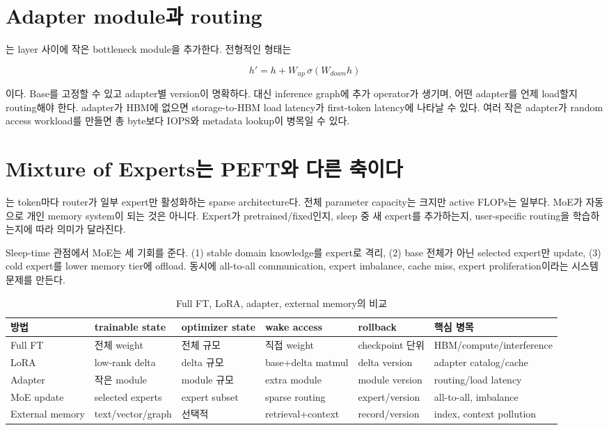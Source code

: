 \section{Adapter module과 routing}

는 layer 사이에 작은 bottleneck module을 추가한다. 전형적인 형태는

\begin{equation}
  h' = h + W_{up}\,\sigma(W_{down}h)
\end{equation}

이다. Base를 고정할 수 있고 adapter별 version이 명확하다. 대신 inference graph에 추가
operator가 생기며, 어떤 adapter를 언제 load할지 routing해야 한다. adapter가 HBM에 없으면
storage-to-HBM load latency가 first-token latency에 나타날 수 있다. 여러 작은 adapter가
random access workload를 만들면 총 byte보다 IOPS와 metadata lookup이 병목일 수 있다.

\section{Mixture of Experts는 PEFT와 다른 축이다}

는 token마다 router가 일부 expert만
활성화하는 sparse architecture다. 전체 parameter capacity는 크지만 active FLOPs는 일부다.
MoE가 자동으로 개인 memory system이 되는 것은 아니다. Expert가 pretrained/fixed인지,
sleep 중 새 expert를 추가하는지, user-specific routing을 학습하는지에 따라 의미가 달라진다.

Sleep-time 관점에서 MoE는 세 기회를 준다. (1) stable domain knowledge를 expert로 격리,
(2) base 전체가 아닌 selected expert만 update, (3) cold expert를 lower memory tier에 offload.
동시에 all-to-all communication, expert imbalance, cache miss, expert proliferation이라는 시스템
문제를 만든다.

\begin{table}[htbp]
\centering
\caption{Full FT, LoRA, adapter, external memory의 비교}
\label{tab:bg-peft-comparison}
\small
\begin{tabularx}{\textwidth}{L{0.15\textwidth}YYYYY}
\toprule
방법 & trainable state & optimizer state & wake access & rollback & 핵심 병목 \\
\midrule
Full FT & 전체 weight & 전체 규모 & 직접 weight & checkpoint 단위 & HBM/compute/interference \\
LoRA & low-rank delta & delta 규모 & base+delta matmul & delta version & adapter catalog/cache \\
Adapter & 작은 module & module 규모 & extra module & module version & routing/load latency \\
MoE update & selected experts & expert subset & sparse routing & expert/version & all-to-all, imbalance \\
External memory & text/vector/graph & 선택적 & retrieval+context & record/version & index, context pollution \\
\bottomrule
\end{tabularx}
\end{table}

